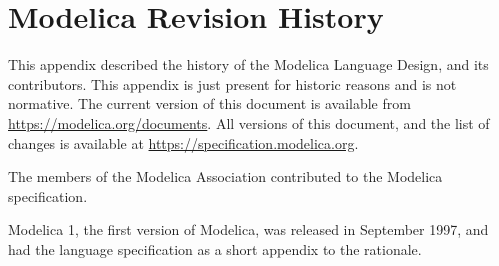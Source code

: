 \chapter{Modelica Revision History}\label{modelica-revision-history}

This appendix described the history of the Modelica Language Design, and its contributors.
This appendix is just present for historic reasons and is not normative.
The current version of this document is available from \url{https://modelica.org/documents}.
All versions of this document, and the list of changes is available at \url{https://specification.modelica.org}.

The members of the Modelica Association contributed to the Modelica specification.

Modelica 1, the first version of Modelica, was released in September
1997, and had the language specification as a short appendix to the
rationale.
